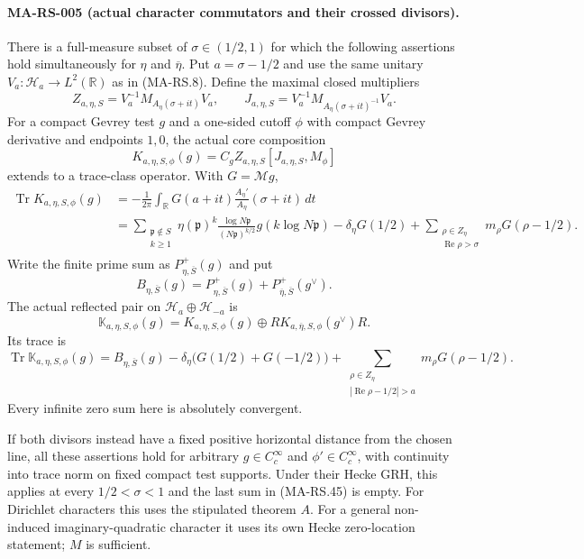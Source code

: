 \paragraph{MA-RS-005 (actual character commutators and their crossed divisors).}
There is a full-measure subset of $\sigma\in(1/2,1)$ for which
the following assertions hold simultaneously for $\eta$ and
$\overline\eta$. Put $a=\sigma-1/2$ and use the same unitary
$V_a:\mathcal H_a\to L^2(\mathbb R)$ as in (MA-RS.8).
Define the maximal closed multipliers
\[
 Z_{a,\eta,S}=V_a^{-1}M_{A_\eta(\sigma+it)}V_a,
 \qquad
 J_{a,\eta,S}=V_a^{-1}M_{A_\eta(\sigma+it)^{-1}}V_a.
 \tag{MA-RS.41}
\]
For a compact Gevrey test $g$ and a one-sided cutoff $\phi$
with compact Gevrey derivative and endpoints $1,0$,
the actual core composition
\[
        K_{a,\eta,S,\phi}(g)
              =C_g Z_{a,\eta,S}[J_{a,\eta,S},M_\phi]
 \tag{MA-RS.42}
\]
extends to a trace-class operator. With $G=\mathcal Mg$,
\[
\begin{aligned}
 \operatorname{Tr}K_{a,\eta,S,\phi}(g)
  &=-\frac1{2\pi}\int_{\mathbb R}G(a+it)
             \frac{A_\eta'}{A_\eta}(\sigma+it)\,dt\\
  &=\sum_{\substack{\mathfrak p\notin S\\k\ge1}}
       \eta(\mathfrak p)^k\frac{\log N\mathfrak p}
                                    {(N\mathfrak p)^{k/2}}
                         g(k\log N\mathfrak p)
       -\delta_\eta G(1/2)
       +\sum_{\substack{\rho\in Z_\eta\\\operatorname{Re}\rho>\sigma}}
                         m_\rho G(\rho-1/2).
\end{aligned}
\tag{MA-RS.43}
\]
Write the finite prime sum as $P^+_{\eta,\overline S}(g)$ and
put
\[
 B_{\eta,\overline S}(g)
   =P^+_{\eta,\overline S}(g)
                  +P^+_{\overline\eta,\overline S}(g^\vee).
\]
The actual reflected pair on $\mathcal H_a\oplus\mathcal H_{-a}$ is
\[
 \mathbb K_{a,\eta,S,\phi}(g)
   =K_{a,\eta,S,\phi}(g)
                  \oplus R K_{a,\overline\eta,S,\phi}(g^\vee)R.
 \tag{MA-RS.44}
\]
Its trace is
\[
 \operatorname{Tr}\mathbb K_{a,\eta,S,\phi}(g)
  =B_{\eta,\overline S}(g)-\delta_\eta\bigl(G(1/2)+G(-1/2)\bigr)
    +\sum_{\substack{\rho\in Z_\eta\\
                |\operatorname{Re}\rho-1/2|>a}}
                         m_\rho G(\rho-1/2).
 \tag{MA-RS.45}
\]
Every infinite zero sum here is absolutely convergent.

If both divisors instead have a fixed positive horizontal distance
from the chosen line, all these assertions hold for arbitrary
$g\in C_c^\infty$ and $\phi'\in C_c^\infty$, with continuity into
trace norm on fixed compact test supports. Under their Hecke GRH,
this applies at every $1/2<\sigma<1$ and the last sum in (MA-RS.45)
is empty. For Dirichlet characters this uses the stipulated theorem
$A$. For a general non-induced imaginary-quadratic character it uses
its own Hecke zero-location statement; $M$ is sufficient.


